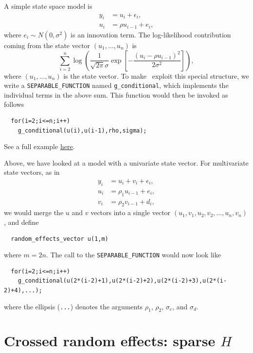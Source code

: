 \documentclass{admbmanual}
\begin{document}
A simple state space model is
\begin{align*}
  y_i &= u_i + \epsilon_i,\\
  u_i &= \rho u_{i-1} + e_i,
\end{align*}
where $e_i\sim N(0,\sigma^2)$ is an innovation term. The log-likelihood
contribution coming from the state vector $(u_1,\ldots,u_n)$ is
\[
\sum_{i=2}^n \log\left(\frac{1}{\sqrt{2\pi}\sigma}
  \exp\left[-\frac{(u_i-\rho u_{i-1})^2}{2\sigma^2}\right]\right),
\]
where $(u_1,\ldots,u_n)$ is the state vector. To make \scAR\ exploit this
special structure, we write a \texttt{SEPARABLE\_FUNCTION} named
\texttt{g\_conditional}, which implements the individual terms in the above sum.
This function would then be invoked as follows
\begin{lstlisting}
  for(i=2;i<=n;i++)
    g_conditional(u(i),u(i-1),rho,sigma);
\end{lstlisting}
See a full example
\href{http://www.otter-rsch.com/admbre/examples/polio/polio.html}{here}.

Above, we have looked at a model with a univariate state vector. For
multivariate state vectors, as in
\begin{align*}
  y_i &= u_i + v_i +\epsilon_i,\\
  u_i &= \rho_1 u_{i-1} + e_i,\\
  v_i &= \rho_2 v_{i-1} + d_i,
\end{align*}
we would merge the $u$ and $v$ vectors into a single vector
$(u_1,v_1,u_2,v_2,\ldots,u_n,v_n)$, and define
\begin{lstlisting}
  random_effects_vector u(1,m)
\end{lstlisting}
where $m=2n$. The call to the \texttt{SEPARABLE\_FUNCTION} would now look like
\begin{lstlisting}
  for(i=2;i<=n;i++)
    g_conditional(u(2*(i-2)+1),u(2*(i-2)+2),u(2*(i-2)+3),u(2*(i-2)+4),...);
\end{lstlisting}
where the ellipsis (\texttt{...}) denotes the arguments $\rho_1$, $\rho_2$,
$\sigma_e$, and $\sigma_d$.

\section{Crossed random effects: sparse $H$}
\end{document}

